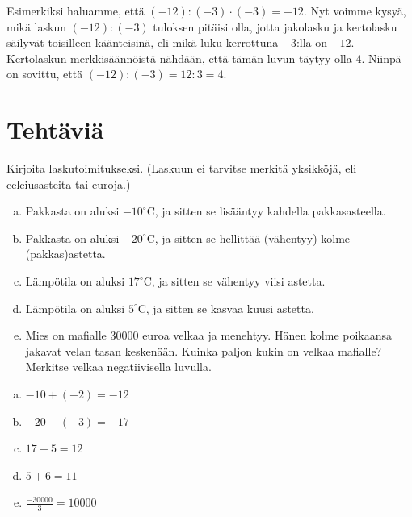     Esimerkiksi haluamme, että $(-12):(-3)\cdot (-3)=-12$. Nyt voimme kysyä, mikä
    laskun $(-12):(-3)$ tuloksen pitäisi olla, jotta jakolasku ja kertolasku
    säilyvät toisilleen käänteisinä, eli mikä luku kerrottuna $-3$:lla on $-12$.
    Kertolaskun merkkisäännöistä nähdään, että tämän luvun täytyy olla $4$.
    Niinpä on sovittu, että $(-12):(-3)=12:3=4$.

\section*{Tehtäviä}

    \begin{tehtava}
        Kirjoita laskutoimitukseksi. (Laskuun ei tarvitse merkitä yksikköjä, eli celciusasteita tai euroja.)


        \begin{enumerate}[a)]
            \item Pakkasta on aluksi $-10 ^{\circ}$C, ja sitten se lisääntyy kahdella pakkasasteella.
            \item Pakkasta on aluksi $-20 ^{\circ}$C, ja sitten se hellittää (vähentyy) kolme (pakkas)astetta.
            \item Lämpötila on aluksi $17 ^{\circ}$C, ja sitten se vähentyy viisi astetta.
            \item Lämpötila on aluksi $5 ^{\circ}$C, ja sitten se kasvaa kuusi astetta.
            \item Mies on mafialle $30 000$ euroa velkaa ja menehtyy. Hänen kolme
                poikaansa jakavat velan tasan keskenään. Kuinka paljon kukin on
                velkaa mafialle? Merkitse velkaa negatiivisella luvulla.
        \end{enumerate}
        
        \begin{vastaus}
            \begin{enumerate}[a)]
                \item $-10+(-2)=-12$
                \item $-20-(-3)=-17$
                \item $17-5=12$
                \item $5+6=11$
                \item $\frac{-30 000}{3}=10 000$
            \end{enumerate}
        \end{vastaus}
    \end{tehtava}
    
